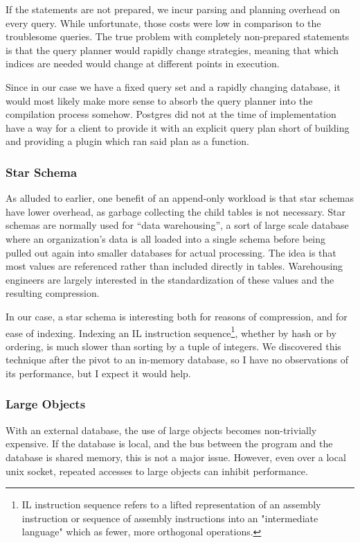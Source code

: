 If the statements are not prepared, we incur parsing and planning overhead on every query.
While unfortunate, those costs were low in comparison to the troublesome queries.
The true problem with completely non-prepared statements is that the query planner would rapidly change strategies, meaning that which indices are needed would change at different points in execution.

Since in our case we have a fixed query set and a rapidly changing database, it would most likely make more sense to absorb the query planner into the compilation process somehow.
Postgres did not at the time of implementation have a way for a client to provide it with an explicit query plan short of building and providing a plugin which ran said plan as a function.

\subsubsection{Star Schema}
As alluded to earlier, one benefit of an append-only workload is that star schemas have lower overhead, as garbage collecting the child tables is not necessary.
Star schemas are normally used for ``data warehousing'', a sort of large scale database where an organization's data is all loaded into a single schema before being pulled out again into smaller databases for actual processing.
The idea is that most values are referenced rather than included directly in tables.
Warehousing engineers are largely interested in the standardization of these values and the resulting compression.

In our case, a star schema is interesting both for reasons of compression, and for ease of indexing.
Indexing an IL instruction sequence\footnote{
IL instruction sequence refers to a lifted representation of an assembly instruction or sequence of assembly instructions into an "intermediate language" which as fewer, more orthogonal operations.
}, whether by hash or by ordering, is much slower than sorting by a tuple of integers.
We discovered this technique after the pivot to an in-memory database, so I have no observations of its performance, but I expect it would help.

\subsubsection{Large Objects}
With an external database, the use of large objects becomes non-trivially expensive.
If the database is local, and the bus between the program and the database is shared memory, this is not a major issue.
However, even over a local unix socket, repeated accesses to large objects can inhibit performance.

